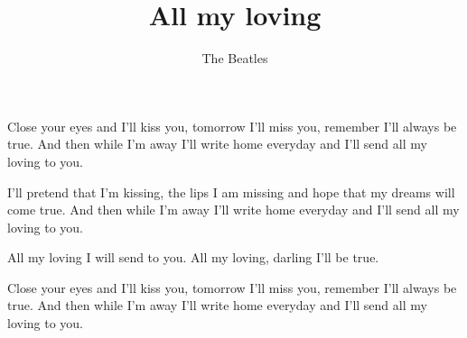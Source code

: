 \beginsong

\title{All my loving}
\author{The Beatles}

\beginverse
Close your eyes and I'll kiss you, tomorrow I'll miss you,
remember I'll always be true. 
And then while I'm away I'll write home everyday
and I'll send all my loving to you.
\endverse

\beginverse
I'll pretend that I'm kissing, the lips I am missing
and hope that my dreams will come true. 
And then while I'm away I'll write home everyday
and I'll send all my loving to you.
\endverse

\beginrefrain
All my loving I will send to you.
All my loving, darling I'll be true.
\endrefrain

\beginverse
Close your eyes and I'll kiss you, tomorrow I'll miss you,
remember I'll always be true. 
And then while I'm away I'll write home everyday
and I'll send all my loving to you.
\endverse




